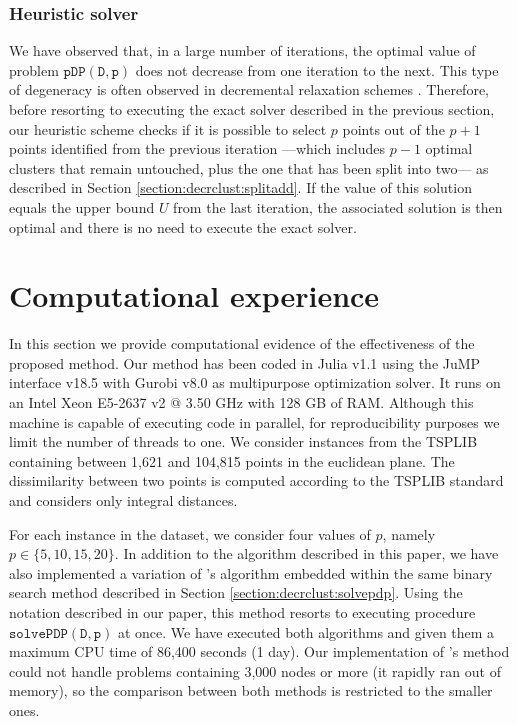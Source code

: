 \documentclass[a4paper,10pt]{article}
\newcommand{\pdp}[2]{$\mathtt{pDP({#1}, {#2})}$}
\newcommand{\solvePDP}[2]{$\mathtt{solvePDP({#1}, {#2})}$}
\begin{document}
\subsubsection{Heuristic solver}

We have observed that, in a large number of iterations, the optimal value of problem \pdp{D}{p} does not decrease from one iteration to the next. This type of degeneracy is often observed in decremental relaxation schemes \citep{Aloise2018sampling, Contardo2019scalable}. Therefore, before resorting to executing the exact solver described in the previous section, our heuristic scheme checks if it is possible to select $p$ points out of the $p + 1$ points identified from the previous iteration ---which includes $p - 1$ optimal clusters that remain untouched, plus the one that has been split into two--- as described in Section \ref{section:decrclust:splitadd}. If the value of this solution equals the upper bound $U$ from the last iteration, the associated solution is then optimal and there is no need to execute the exact solver.

\section{Computational experience\label{section:computation}}

In this section we provide computational evidence of the effectiveness of the proposed method. Our method has been coded in Julia v1.1 using the JuMP interface v18.5 with Gurobi v8.0 as multipurpose optimization solver. It runs on an Intel Xeon E5-2637 v2 @ 3.50 GHz with 128 GB of RAM. Although this machine is capable of executing code in parallel, for reproducibility purposes we limit the number of threads to one. We consider instances from the TSPLIB containing between 1,621 and 104,815 points in the euclidean plane. The dissimilarity between two points is computed according to the TSPLIB standard and considers only integral distances.

For each instance in the dataset, we consider four values of $p$, namely $p\in\{5, 10, 15, 20\}$. In addition to the algorithm described in this paper, we have also implemented a variation of \citet{Sayah2017new}'s algorithm embedded within the same binary search method described in Section \ref{section:decrclust:solvepdp}. Using the notation described in our paper, this method resorts to executing procedure \solvePDP{D}{p} at once. We have executed both algorithms and given them a maximum CPU time of 86,400 seconds (1 day). Our implementation of \citeauthor{Sayah2017new}'s method could not handle problems containing 3,000 nodes or more (it rapidly ran out of memory), so the comparison between both methods is restricted to the smaller ones.
\end{document}
